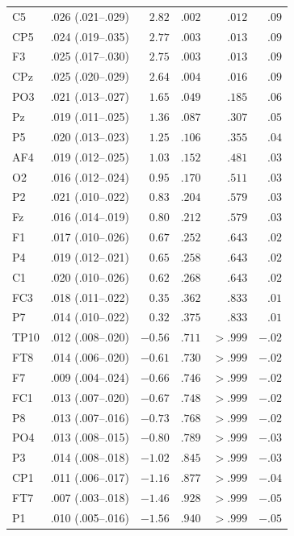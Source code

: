 {\begin{longtable}{llrrrr}
C5 & .026 (.021--.029) & $2.82$ & $.002$ & $.012$ & $.09$ \\
CP5 & .024 (.019--.035) & $2.77$ & $.003$ & $.013$ & $.09$ \\
F3 & .025 (.017--.030) & $2.75$ & $.003$ & $.013$ & $.09$ \\
CPz & .025 (.020--.029) & $2.64$ & $.004$ & $.016$ & $.09$ \\
PO3 & .021 (.013--.027) & $1.65$ & $.049$ & $.185$ & $.06$ \\
Pz & .019 (.011--.025) & $1.36$ & $.087$ & $.307$ & $.05$ \\
P5 & .020 (.013--.023) & $1.25$ & $.106$ & $.355$ & $.04$ \\
AF4 & .019 (.012--.025) & $1.03$ & $.152$ & $.481$ & $.03$ \\
O2 & .016 (.012--.024) & $0.95$ & $.170$ & $.511$ & $.03$ \\
P2 & .021 (.010--.022) & $0.83$ & $.204$ & $.579$ & $.03$ \\
Fz & .016 (.014--.019) & $0.80$ & $.212$ & $.579$ & $.03$ \\
F1 & .017 (.010--.026) & $0.67$ & $.252$ & $.643$ & $.02$ \\
P4 & .019 (.012--.021) & $0.65$ & $.258$ & $.643$ & $.02$ \\
C1 & .020 (.010--.026) & $0.62$ & $.268$ & $.643$ & $.02$ \\
FC3 & .018 (.011--.022) & $0.35$ & $.362$ & $.833$ & $.01$ \\
P7 & .014 (.010--.022) & $0.32$ & $.375$ & $.833$ & $.01$ \\
TP10 & .012 (.008--.020) & $-0.56$ & $.711$ & $> .999$ & $-.02$ \\
FT8 & .014 (.006--.020) & $-0.61$ & $.730$ & $> .999$ & $-.02$ \\
F7 & .009 (.004--.024) & $-0.66$ & $.746$ & $> .999$ & $-.02$ \\
FC1 & .013 (.007--.020) & $-0.67$ & $.748$ & $> .999$ & $-.02$ \\
P8 & .013 (.007--.016) & $-0.73$ & $.768$ & $> .999$ & $-.02$ \\
PO4 & .013 (.008--.015) & $-0.80$ & $.789$ & $> .999$ & $-.03$ \\
P3 & .014 (.008--.018) & $-1.02$ & $.845$ & $> .999$ & $-.03$ \\
CP1 & .011 (.006--.017) & $-1.16$ & $.877$ & $> .999$ & $-.04$ \\
FT7 & .007 (.003--.018) & $-1.46$ & $.928$ & $> .999$ & $-.05$ \\
P1 & .010 (.005--.016) & $-1.56$ & $.940$ & $> .999$ & $-.05$ \\

\end{longtable}}
